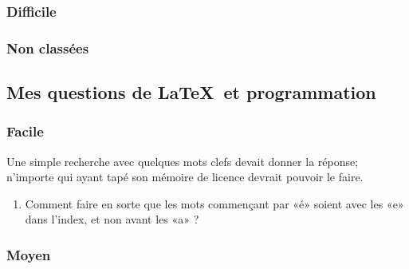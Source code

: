 \subsubsection{Difficile}

\subsubsection{Non classées}

\subsection{Mes questions de \LaTeX\ et programmation}

\subsubsection{Facile}

Une simple recherche avec quelques mots clefs devait donner la réponse; n'importe qui ayant tapé son mémoire de licence devrait pouvoir le faire.

\begin{enumerate}
    \item
        Comment faire en sorte que les mots commençant par «é» soient avec les «e» dans l'index, et non avant les «a» ?
\end{enumerate}

\subsubsection{Moyen}

